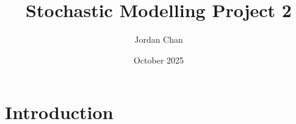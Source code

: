 \documentclass{article}
\title{Stochastic Modelling Project 2}
\author{Jordan Chan}
\date{October 2025}
\begin{document}
\maketitle

\section{Introduction}
\end{document}
